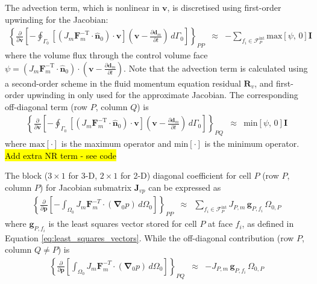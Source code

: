 \documentclass[sn-mathphys,Numbered]{sn-jnl}%
\newcommand{\bb}{\boldsymbol}
\begin{document}
The advection term, which is nonlinear in $\bb{v}$, is discretised using first-order upwinding for the Jacobian:
\begin{eqnarray}
	\left\{
    	\frac{\partial}{\partial \bb{v}}
	\left[
	- \oint_{\Gamma_0}  \left[ \left( J_m \bb{F}_m^{-\text{T}} \cdot \hat{\bb{n}}_0 \right) \cdot \bb{v} \right] \left(\bb{v} - \frac{\partial \bb{d}_m}{\partial t} \right) \, d\Gamma_0
	\right]
	\right\}_{PP} &\approx&
	- \sum_{f_i \in \mathcal{F}^{\text{int}}_P} \text{max}\left[\psi, \, 0 \right] \textbf{I}
\end{eqnarray}
where the volume flux through the control volume face $\psi = \left( J_m \bb{F}_m^{-\text{T}} \cdot \hat{\bb{n}}_0 \right) \cdot \left(\bb{v} - \frac{\partial \bb{d}_m}{\partial t} \right)$.
Note that the advection term is calculated using a second-order scheme in the fluid momentum equation residual $\bb{R}_v$, and first-order upwinding in only used for the approximate Jacobian.
The corresponding off-diagonal term (row $P$, column $Q$) is
\begin{eqnarray}
	\left\{
    	\frac{\partial}{\partial \bb{v}}
	\left[
	- \oint_{\Gamma_0}  \left[ \left( J_m \bb{F}_m^{-\text{T}} \cdot \hat{\bb{n}}_0 \right) \cdot \bb{v} \right] \left(\bb{v} - \frac{\partial \bb{d}_m}{\partial t} \right) \, d\Gamma_0
	\right]
	\right\}_{PQ} &\approx& \text{min}\left[\psi, \, 0 \right] \textbf{I}
\end{eqnarray}
where $\text{max}\left[\cdot\right]$ is the maximum operator and $\text{min}\left[\cdot\right]$ is the minimum operator. \hl{Add extra NR term - see code}


The block ($3\times1$ for 3-D, $2\times1$ for 2-D) diagonal coefficient for cell $P$ (row $P$, column $P$) for Jacobian submatrix $\bb{J}_{vp}$ can be expressed as
\begin{eqnarray}
	\left\{
    	\frac{\partial}{\partial \bb{p}}
	\left[
	-\int_{\Omega_0} J_m \bb{F}_m^{-T} \cdot \left( \bb{\nabla}_0 p \right) \, d\Omega_0
	\right]
	\right\}_{PP}
	&\approx& \sum_{f_i \in \mathcal{F}^{\text{int}}_P} J_{P,m} \, \bb{g}_{P,f_i} \,  \Omega_{0,P}
\end{eqnarray}
where $\bb{g}_{P, f_i}$ is the least squares vector stored for cell $P$ at face $f_i$, as defined in Equation \ref{eq:least_squares_vectors}.
While the off-diagonal contribution (row $P$, column $Q \neq P$) is
\begin{eqnarray}
	\left\{
    	\frac{\partial}{\partial \bb{p}}
	\left[
	\int_{\Omega_0} J_m \bb{F}_m^{-T} \cdot \left( \bb{\nabla}_0 p \right) \, d\Omega_0
	\right]
	\right\}_{PQ}
	&\approx& -J_{P,m} \, \bb{g}_{P,f_i} \,  \Omega_{0,P}
\end{eqnarray}
\end{document}
